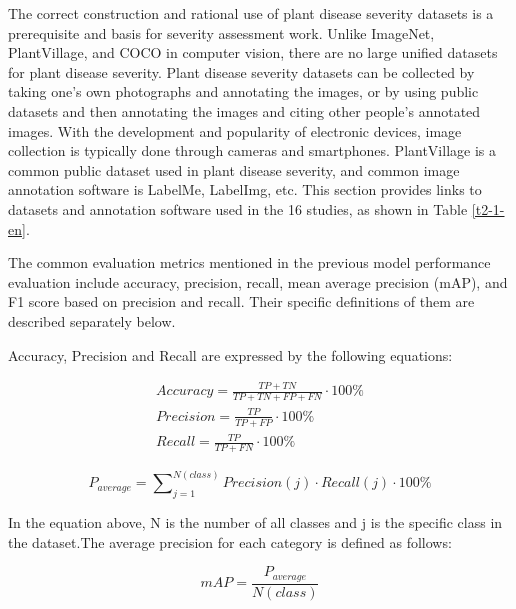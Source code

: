 The correct construction and rational use of plant disease severity datasets is a prerequisite and basis for severity assessment work. Unlike ImageNet, PlantVillage, and COCO in computer vision, there are no large unified datasets for plant disease severity. Plant disease severity datasets can be collected by taking one's own photographs and annotating the images, or by using public datasets and then annotating the images and citing other people's annotated images. With the development and popularity of electronic devices, image collection is typically done through cameras and smartphones. PlantVillage is a common public dataset used in plant disease severity, and common image annotation software is LabelMe, LabelImg, etc. This section provides links to datasets and annotation software used in the 16 studies, as shown in Table \ref{t2-1-en}.


The common evaluation metrics mentioned in the previous model performance evaluation include accuracy, precision, recall, mean average precision (mAP), and F1 score based on precision and recall. Their specific definitions of them are described separately below.

Accuracy, Precision and Recall are expressed by the following equations:


\begin{align*} Accuracy = \frac{TP + TN}{{TP + TN + FP + FN}} \cdot 100\% \tag{1}\\ Precision = \frac{TP}{{TP + FP}} \cdot 100\% \tag{2}\\ Recall = \frac{TP}{{TP + FN}} \cdot 100\% \tag{3}\end{align*}

\begin{equation*} P_{average} = \sum\nolimits_{j = 1}^{{N\left( {class} \right)}} {Precision\left( j \right) \cdot Recall\left( j \right) \cdot 100\% }\tag{4}\end{equation*}

In the equation above, N is the number of all classes and j is the specific class in the dataset.The average precision for each category is defined as follows:

\begin{equation*} mAP = \frac{{P_{average} }}{{N\left( {class} \right)}}\tag{5}\end{equation*}

